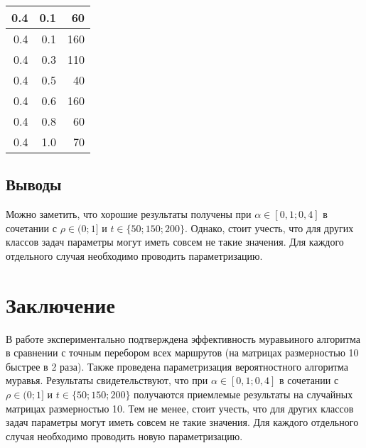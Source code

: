 \documentclass[a4paper,12pt]{article}
\begin{document}
\begin{table} [h!]
\begin{center}
\begin{tabular}{|r|r|r|}
			\hline
			0.4 &        0.1 &         60 \\
			\hline
			0.4 &        0.1 &        160 \\
			\hline
			0.4 &        0.3 &        110 \\
			\hline
			0.4 &        0.5 &         40 \\
			\hline
			0.4 &        0.6 &        160 \\
			\hline
			0.4 &        0.8 &         60 \\
			\hline
			0.4 &        1.0 &         70 \\
			\hline
		\end{tabular}    
		\label{param2}
	\end{center}
\end{table} 

\pagebreak

\subsection*{Выводы}

Можно заметить, что хорошие результаты получены
при $\alpha \in [0,1; 0,4]$ в сочетании с $\rho \in (0; 1]$ и 
$t \in \{50; 150; 200\}$. Однако,
стоит учесть, что для других классов задач
параметры могут иметь совсем не такие значения. Для
каждого отдельного случая необходимо проводить
параметризацию.

\section*{Заключение}

В работе экспериментально подтверждена эффективность
муравьиного алгоритма в сравнении с точным перебором
всех маршрутов (на матрицах размерностью 10 быстрее в 2 раза). Также проведена параметризация вероятностного
алгоритма муравья. Результаты свидетельствуют, что
при $\alpha \in [0,1; 0,4]$ в сочетании с $\rho \in (0; 1]$ и 
$t \in \{50; 150; 200\}$ получаются
приемлемые результаты на случайных матрицах размерностью 10.
Тем не менее,
стоит учесть, что для других классов задач
параметры могут иметь совсем не такие значения. Для
каждого отдельного случая необходимо проводить
новую параметризацию.
\end{document}
